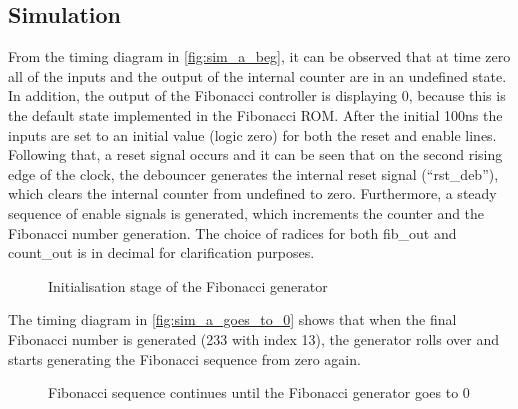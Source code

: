\documentclass[10pt]{article}
\begin{document}
\subsection{Simulation}
From the timing diagram in \autoref{fig:sim_a_beg}, it can be observed that at time zero all of the inputs and the output of the internal counter are in an undefined state. In addition, the output of the Fibonacci controller is displaying 0, because this is the default state implemented in the Fibonacci ROM. After the initial 100ns the inputs are set to an initial value (logic zero) for both the reset and enable lines.
Following that, a reset signal occurs and it can be seen that on the second rising edge of the clock, the debouncer generates the internal reset signal (“rst\_deb”), which clears the internal counter from undefined to zero. Furthermore, a steady sequence of enable signals is generated, which increments the counter and the Fibonacci number generation. The choice of radices for both fib\_out and count\_out is in decimal for clarification purposes.
\begin{figure}[ht]
    \centering
    \caption{Initialisation stage of the Fibonacci generator}
    \label{fig:sim_a_beg}
\end{figure}

The timing diagram in \autoref{fig:sim_a_goes_to_0} shows that when the final Fibonacci number is generated (233 with index 13), the generator rolls over and starts generating the Fibonacci sequence from zero again.
\begin{figure}[ht]
    \centering
    \caption{Fibonacci sequence continues until the Fibonacci generator goes to 0}
    \label{fig:sim_a_goes_to_0}
\end{figure}
\newpage
\end{document}
